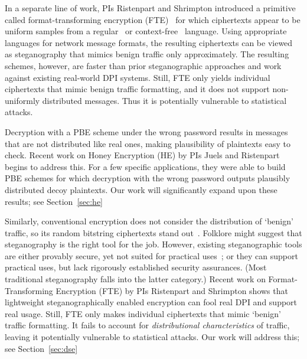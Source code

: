 {In a separate line of work, PIs Ristenpart and Shrimpton introduced a primitive
called format-transforming encryption (FTE)~\cite{Dyer-2013} for which
ciphertexts appear to be
uniform samples from a regular~\cite{Dyer-2013,luchaup2014libfte} 
or context-free~\cite{luchaup2014formatted} language.
Using appropriate languages for network message formats, the resulting
ciphertexts can be viewed as steganography that mimics 
benign traffic only approximately. The resulting 
schemes, however, are faster than prior steganographic approaches and work against
existing real-world DPI systems. Still, FTE only yields {individual} ciphertexts that
mimic benign traffic formatting, and it does not support non-uniformly 
distributed messages. Thus it is potentially
vulnerable to statistical attacks.  
 
\iffalse
Decryption with a PBE scheme under the wrong password results in
messages that are not distributed like real ones, making plausibility
of plaintexts easy to check.  Recent work on Honey Encryption (HE) by PIs Juels and
Ristenpart begins to address this.  For a few specific applications,
they were able to build PBE schemes for which decryption with the wrong
password outputs plausibly distributed decoy plaintexts. 
Our work will significantly expand upon these results; see Section~\ref{sec:he}

Similarly, conventional encryption does not consider the distribution
of `benign' traffic, so its random bitstring ciphertexts stand
out~\cite{KBMP13}.  Folklore might suggest that steganography 
is the right tool for the job.  However, existing
steganographic tools are either provably secure, yet not suited for
practical uses~\cite{Hopper:Provable_Stego}; or they can support
practical uses, but lack rigorously established security
assurances. (Most traditional steganography falls into the latter category.)
Recent work on Format-Transforming Encryption (FTE) by PIs Ristenpart
and Shrimpton shows that lightweight steganographically enabled
encryption can fool real DPI and support real usage.  Still, FTE only makes
{individual} ciphertexts that mimic `benign' traffic formatting.  
It fails to account for \textit{distributional characteristics} of
traffic, leaving it potentially vulnerable to statistical attacks.  
Our work will address this; see Section~\ref{sec:dse}


}
